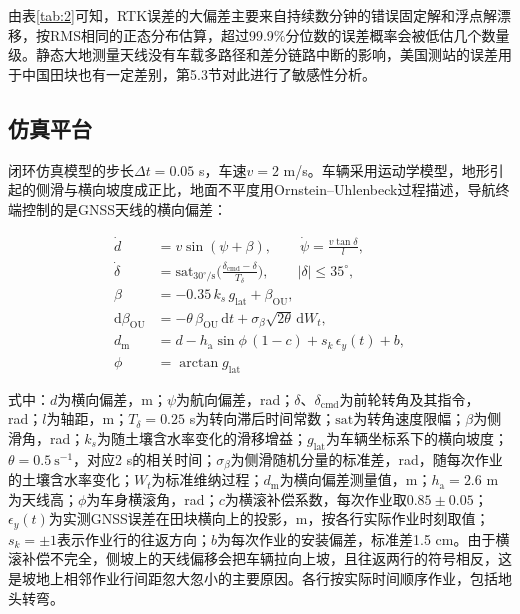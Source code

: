 \documentclass[preprint,12pt,number,sort&compress]{elsarticle}
\begin{document}
由表\ref{tab:2}可知，RTK误差的大偏差主要来自持续数分钟的错误固定解和浮点解漂移，按RMS相同的正态分布估算，超过99.9\%分位数的误差概率会被低估几个数量级。静态大地测量天线没有车载多路径和差分链路中断的影响，美国测站的误差用于中国田块也有一定差别，第5.3节对此进行了敏感性分析。

\subsection{仿真平台}

闭环仿真模型的步长\(\Delta t=0.05\) s，车速\(v=2\) m/s。车辆采用运动学模型，地形引起的侧滑与横向坡度成正比，地面不平度用Ornstein--Uhlenbeck过程描述，导航终端控制的是GNSS天线的横向偏差：

\begin{equation}
\begin{aligned}
\dot d&=v\sin(\psi+\beta),\qquad \dot\psi=\frac{v\tan\delta}{l},\\
\dot\delta&=\mathrm{sat}_{30^\circ/\mathrm s}\Big(\frac{\delta_\mathrm{cmd}-\delta}{T_\delta}\Big),\qquad |\delta|\le35^\circ,\\
\beta&=-0.35\,k_s\,g_\mathrm{lat}+\beta_\mathrm{OU},\\
\mathrm d\beta_\mathrm{OU}&=-\theta\,\beta_\mathrm{OU}\,\mathrm dt+\sigma_\beta\sqrt{2\theta}\,\mathrm dW_t,\\
d_\mathrm m&=d-h_\mathrm a\sin\phi\,(1-c)+s_k\,\epsilon_y(t)+b,\\
\phi&=\arctan g_\mathrm{lat}
\end{aligned}
\end{equation}

式中：\(d\)为横向偏差，m；\(\psi\)为航向偏差，rad；\(\delta\)、\(\delta_\mathrm{cmd}\)为前轮转角及其指令，rad；\(l\)为轴距，m；\(T_\delta=0.25\) s为转向滞后时间常数；\(\mathrm{sat}\)为转角速度限幅；\(\beta\)为侧滑角，rad；\(k_s\)为随土壤含水率变化的滑移增益；\(g_\mathrm{lat}\)为车辆坐标系下的横向坡度；\(\theta=0.5\ \mathrm s^{-1}\)，对应2 s的相关时间；\(\sigma_\beta\)为侧滑随机分量的标准差，rad，随每次作业的土壤含水率变化；\(W_t\)为标准维纳过程；\(d_\mathrm m\)为横向偏差测量值，m；\(h_\mathrm a=2.6\) m为天线高；\(\phi\)为车身横滚角，rad；\(c\)为横滚补偿系数，每次作业取\(0.85\pm0.05\)；\(\epsilon_y(t)\)为实测GNSS误差在田块横向上的投影，m，按各行实际作业时刻取值；\(s_k=\pm1\)表示作业行的往返方向；\(b\)为每次作业的安装偏差，标准差1.5 cm。由于横滚补偿不完全，侧坡上的天线偏移会把车辆拉向上坡，且往返两行的符号相反，这是坡地上相邻作业行间距忽大忽小的主要原因。各行按实际时间顺序作业，包括地头转弯。
\end{document}
